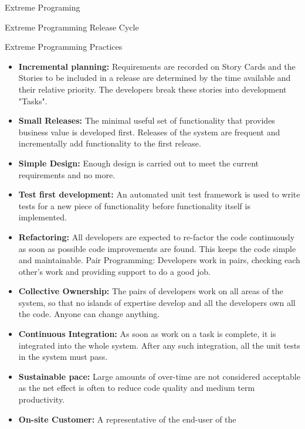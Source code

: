 \documentclass[final,hyperref={pdfpagelabels=false}]{beamer}
\begin{document}
\begin{frame}{Extreme Programing}
\begin{block}{\large  Extreme Programming Release Cycle}
    \end{block}
    \vfill
    \begin{block}{\large Extreme Programming Practices}
        \centering
        \begin{itemize}
            \item \textbf{ Incremental planning:} Requirements are recorded on
            Story Cards and the Stories to be included in a release are
            determined by the time available and their relative priority.
            The developers break these stories into development
            "Tasks".
            \item \textbf{ Small Releases:} The minimal useful set of functionality
            that provides business value is developed first. Releases of
            the system are frequent and incrementally add
            functionality to the first release.
            \item \textbf{ Simple Design:} Enough design is carried out to meet the
            current requirements and no more.
            \item \textbf{ Test first development:} An automated unit test
            framework is used to write tests for a new piece of
            functionality before functionality itself is implemented.
            \item \textbf{ Refactoring:} All developers are expected to re-factor the
            code continuously as soon as possible code improvements
            are found. This keeps the code simple and maintainable.
            Pair Programming: Developers work in pairs, checking
            each other’s work and providing support to do a good job.
            \item \textbf{ Collective Ownership:} The pairs of developers work on
            all areas of the system, so that no islands of expertise
            develop and all the developers own all the code. Anyone
            can change anything.
            \item \textbf{ Continuous Integration:} As soon as work on a task is
            complete, it is integrated into the whole system. After any
            such integration, all the unit tests in the system must pass.
            \item \textbf{ Sustainable pace:} Large amounts of over-time are not
            considered acceptable as the net effect is often to reduce
            code quality and medium term productivity.
            \item \textbf{ On-site Customer:} A representative of the end-user of the

\end{itemize}
\end{block}
\end{frame}
\end{document}
